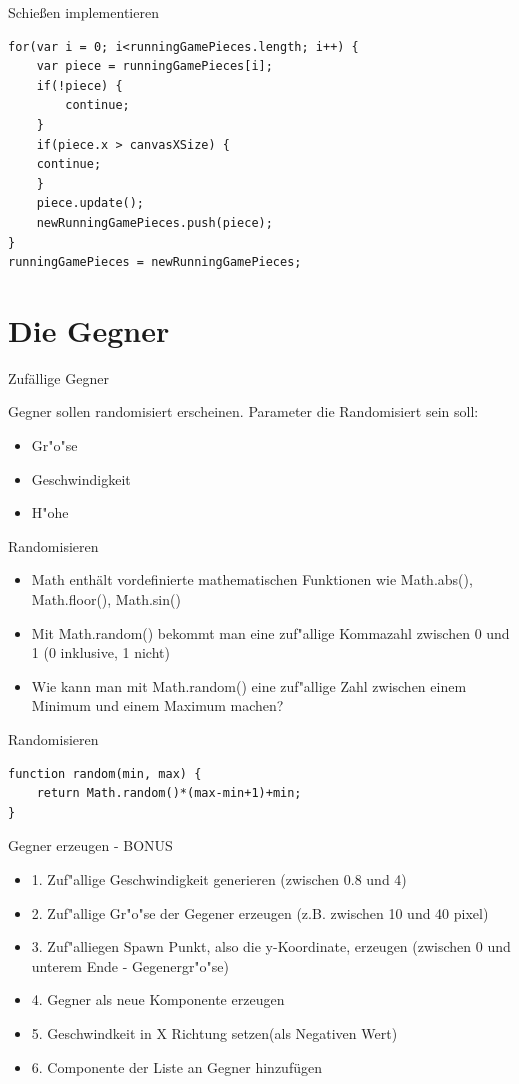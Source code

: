 \documentclass[18pt]{beamer}
\begin{document}
\begin{frame}[fragile]{Schießen implementieren}
\begin{lstlisting}
for(var i = 0; i<runningGamePieces.length; i++) {
	var piece = runningGamePieces[i];
	if(!piece) {
		continue;
	}
	if(piece.x > canvasXSize) {
	continue;
	}
	piece.update();
	newRunningGamePieces.push(piece);
}
runningGamePieces = newRunningGamePieces;
\end{lstlisting}
\end{frame}


\section{Die Gegner}
\begin{frame}{Zufällige Gegner}

Gegner sollen randomisiert erscheinen.
Parameter die Randomisiert sein soll:
\begin{itemize}
	\item Gr"o"se
	\item Geschwindigkeit
	\item H"ohe
\end{itemize}
\end{frame}

\begin{frame}{Randomisieren}
\begin{itemize}
	\item Math enthält vordefinierte mathematischen Funktionen wie Math.abs(), Math.floor(), Math.sin()
	\item Mit Math.random() bekommt man eine zuf"allige Kommazahl zwischen 0 und 1 (0 inklusive, 1 nicht)
	\item Wie kann man mit Math.random() eine zuf"allige Zahl zwischen einem Minimum und einem Maximum machen?
	
\end{itemize}
\end{frame}

\begin{frame}[fragile]{Randomisieren}
\begin{lstlisting}
function random(min, max) {
	return Math.random()*(max-min+1)+min;
}
\end{lstlisting}
\end{frame}

\begin{frame}[fragile]{Gegner erzeugen - BONUS}
\begin{itemize}
	\item 1. Zuf"allige Geschwindigkeit generieren (zwischen 0.8 und 4)
	 \item 2. Zuf"allige Gr"o"se der Gegener erzeugen (z.B. zwischen 10 und 40 pixel)  
	\item 3. Zuf"alliegen Spawn Punkt, also die y-Koordinate, erzeugen (zwischen 0 und unterem Ende - Gegenergr"o"se) 
	\item 4. Gegner als neue Komponente erzeugen
	\item 5. Geschwindkeit in X Richtung setzen(als Negativen Wert)
	\item 6. Componente der Liste an Gegner hinzufügen	
\end{itemize}
\end{frame}
\end{document}
